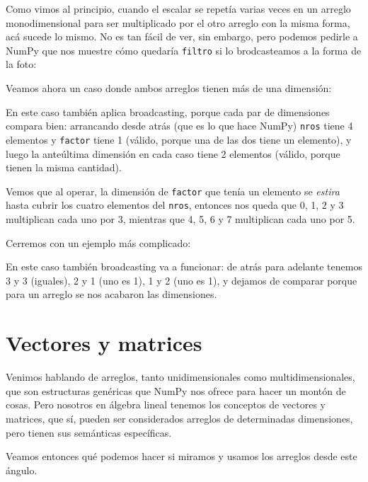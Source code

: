 Como vimos al principio, cuando el escalar se repetía varias veces en un arreglo monodimensional para ser multiplicado por el otro arreglo con la misma forma, acá sucede lo mismo. No es tan fácil de ver, sin embargo, pero podemos pedirle a NumPy que nos muestre cómo quedaría \verb|filtro| si lo brodcasteamos a la forma de la foto:


Veamos ahora un caso donde ambos arreglos tienen más de una dimensión:


En este caso también aplica broadcasting, porque cada par de dimensiones compara bien: arrancando desde atrás (que es lo que hace NumPy) \verb|nros| tiene 4 elementos y \verb|factor| tiene 1 (válido, porque una de las dos tiene un elemento), y luego la anteúltima dimensión en cada caso tiene 2 elementos (válido, porque tienen la misma cantidad).


Vemos que al operar, la dimensión de \verb|factor| que tenía un elemento se \textit{estira} hasta cubrir los cuatro elementos del \verb|nros|, entonces nos queda que 0, 1, 2 y 3 multiplican cada uno por 3, mientras que 4, 5, 6 y 7 multiplican cada uno por 5.

Cerremos con un ejemplo más complicado:


En este caso también broadcasting va a funcionar: de atrás para adelante tenemos 3 y 3 (iguales), 2 y 1 (uno es 1), 1 y 2 (uno es 1), y dejamos de comparar porque para un arreglo se nos acabaron las dimensiones.



\section{Vectores y matrices}

Venimos hablando de arreglos, tanto unidimensionales como multidimensionales, que son estructuras genéricas que NumPy nos ofrece para hacer un montón de cosas. Pero nosotros en álgebra lineal tenemos los conceptos de vectores y matrices, que sí, pueden ser considerados arreglos de determinadas dimensiones, pero tienen sus semánticas específicas.

Veamos entonces qué podemos hacer si miramos y usamos los arreglos desde este ángulo.

